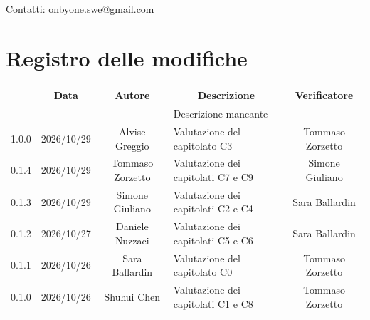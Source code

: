 \documentclass[11pt, a4paper]{article}
\begin{document}
\begin{titlepage}
    \vspace{0.5cm}
    
    {\large Contatti: \href{mailto:onbyone.swe@gmail.com}{onbyone.swe@gmail.com} }
    
\end{titlepage}

\newpage

\section*{Registro delle modifiche}

\vspace{1cm}
\begin{center}
    \renewcommand{\arraystretch}{1.5}
    \begin{tabularx}{\textwidth}{|c|c|c|X|c|}
        \hline
        \rowcolor{gray!10} 
        \multicolumn{1}{|c|}{\textbf{Versione}} & 
        \multicolumn{1}{c|}{\textbf{Data}} & 
        \multicolumn{1}{c|}{\textbf{Autore}} & 
        \multicolumn{1}{c|}{\textbf{Descrizione}} & 
        \multicolumn{1}{c|}{\textbf{Verificatore}} \\
        \hline
        - & - & - & Descrizione mancante & - \\
        \hline
        1.0.0 & 2026/10/29 & Alvise Greggio & Valutazione del capitolato C3 & Tommaso Zorzetto \\
        \hline
        0.1.4 & 2026/10/29 & Tommaso Zorzetto & Valutazione dei capitolati C7 e C9 & Simone Giuliano \\
        \hline
        0.1.3 & 2026/10/29 & Simone Giuliano & Valutazione dei capitolati C2 e C4 & Sara Ballardin \\
        \hline
        0.1.2 & 2026/10/27 & Daniele Nuzzaci & Valutazione dei capitolati C5 e C6 & Sara Ballardin \\
        \hline
        0.1.1 & 2026/10/26 & Sara Ballardin & Valutazione del capitolato C0 & Tommaso Zorzetto \\
        \hline
        0.1.0 & 2026/10/26 & Shuhui Chen & Valutazione dei capitolati C1 e C8 & Tommaso Zorzetto \\
        \hline
    \end{tabularx}
\end{center}
\vfill
\newpage
\end{document}
